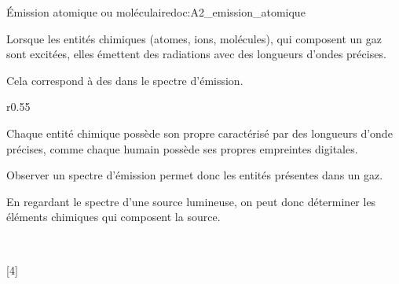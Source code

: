 \begin{doc}{Émission atomique ou moléculaire}{doc:A2_emission_atomique}
  \begin{importants}
    Lorsque les entités chimiques (atomes, ions, molécules), qui composent un gaz sont excitées, elles émettent des radiations avec des longueurs d'ondes précises.
    
    Cela correspond à des  dans le spectre d'émission.
  \end{importants}
  
  \begin{wrapfigure}[11]{r}{0.55\linewidth}
    \centering
    \vspace*{-22pt}
  \end{wrapfigure}
    
  Chaque entité chimique possède son propre  caractérisé par des longueurs d'onde précises, comme chaque humain possède ses propres empreintes digitales.

  Observer un spectre d'émission permet donc  les entités présentes dans un gaz.

  En regardant le spectre d'une source lumineuse, on peut donc déterminer les éléments chimiques qui composent la source.

  \vspace*{-8pt}
  \begin{center}
     \\[-4pt]
  \end{center}
\end{doc}


[4]
